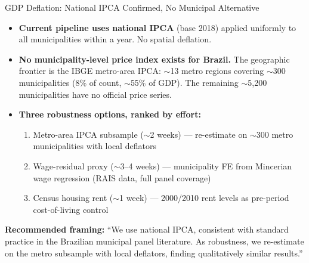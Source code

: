 \documentclass[aspectratio=169,10pt]{beamer}
\begin{document}

\begin{frame}[t]{GDP Deflation: National IPCA Confirmed, No Municipal Alternative}

\begin{itemize}\setlength{\itemsep}{0.3em}
  \item \textbf{Current pipeline uses national IPCA} (base 2018) applied uniformly
    to all municipalities within a year.  No spatial deflation.

  \item \textbf{No municipality-level price index exists for Brazil.}
    The geographic frontier is the IBGE metro-area IPCA: $\sim$13 metro regions
    covering $\sim$300 municipalities (8\% of count, $\sim$55\% of GDP).
    The remaining $\sim$5,200 municipalities have no official price series.

  \item \textbf{Three robustness options, ranked by effort:}
    \begin{enumerate}\setlength{\itemsep}{0.1em}
      \item Metro-area IPCA subsample ($\sim$2 weeks) --- re-estimate on $\sim$300
        metro municipalities with local deflators
      \item Wage-residual proxy ($\sim$3--4 weeks) --- municipality FE from
        Mincerian wage regression (RAIS data, full panel coverage)
      \item Census housing rent ($\sim$1 week) --- 2000/2010 rent levels as
        pre-period cost-of-living control
    \end{enumerate}
\end{itemize}

\vspace{0.3em}
\textcolor{alertred}{\footnotesize\textbf{Recommended framing:} ``We use national IPCA, consistent with standard practice in the Brazilian municipal panel literature.  As robustness, we re-estimate on the metro subsample with local deflators, finding qualitatively similar results.''}
\end{frame}

\end{document}
